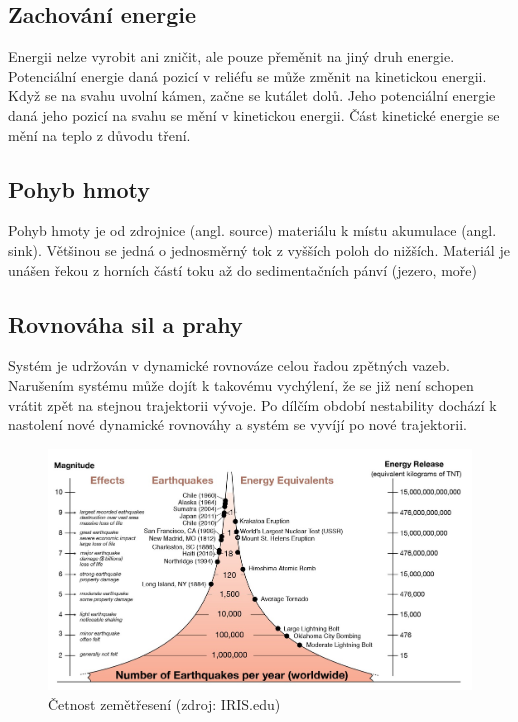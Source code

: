 {\subsection{Zachování energie}
Energii nelze vyrobit ani zničit, ale pouze přeměnit na jiný druh energie. Potenciální energie daná pozicí v reliéfu se může změnit na kinetickou energii. Když se na svahu uvolní kámen, začne se kutálet dolů. Jeho potenciální energie daná jeho pozicí na svahu se mění v kinetickou energii. Část kinetické energie se mění na teplo z důvodu tření. 

\subsection{Pohyb hmoty}
Pohyb hmoty je od zdrojnice (angl. source) materiálu k místu akumulace (angl. sink). Většinou se jedná o jednosměrný tok z vyšších poloh do nižších. Materiál je unášen řekou z horních částí toku až do sedimentačních pánví (jezero, moře)

\subsection{Rovnováha sil a prahy}
Systém je udržován v dynamické rovnováze celou řadou zpětných vazeb. Narušením systému může dojít k takovému vychýlení, že se již není schopen vrátit zpět na stejnou trajektorii vývoje. Po dílčím období nestability dochází k nastolení nové dynamické rovnováhy a systém se vyvíjí po nové trajektorii.

\begin{figure}[h]
	\centering
	\includegraphics[width=1\linewidth]{obrazky/uvod/frekvence}
	\caption{Četnost zemětřesení (zdroj: IRIS.edu)}
	\label{fig:frekvence}
\end{figure}

}
